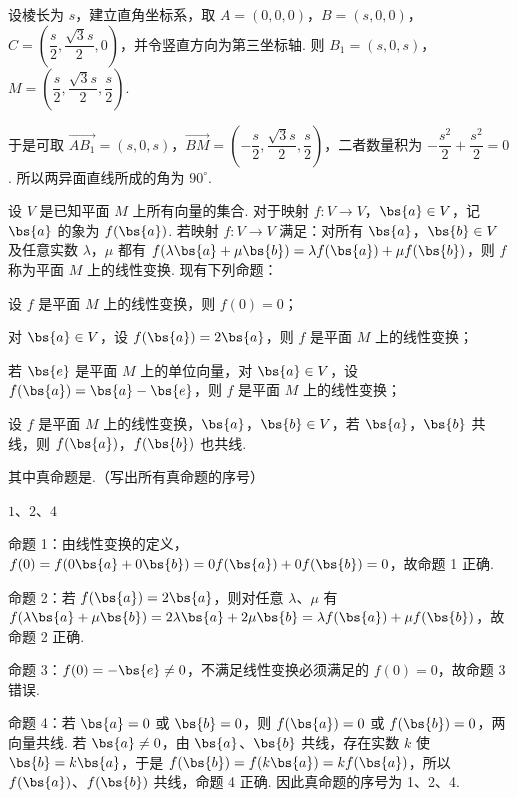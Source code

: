 \begin{solution}
设棱长为 \(s\)，建立直角坐标系，取 \(A=(0,0,0)\)，\(B=(s,0,0)\)，\(C=\left(\dfrac{s}{2},\dfrac{\sqrt{3}s}{2},0\right)\)，并令竖直方向为第三坐标轴. 则 \(B_1=(s,0,s)\)，\(M=\left(\dfrac{s}{2},\dfrac{\sqrt{3}s}{2},\dfrac{s}{2}\right)\).

于是可取 \(\overrightarrow{AB_1}=(s,0,s)\)，\(\overrightarrow{BM}=\left(-\dfrac{s}{2},\dfrac{\sqrt{3}s}{2},\dfrac{s}{2}\right)\)，二者数量积为 \(-\dfrac{s^2}{2}+\dfrac{s^2}{2}=0\). 所以两异面直线所成的角为 \(90^{\circ}\).
\end{solution}

\begin{problem}
设 \(V\) 是已知平面 \(M\) 上所有向量的集合. 对于映射 \(f: V \to V\)，\(\bs{a} \in V\)，记 \(\bs{a}\) 的象为 \(f(\bs{a})\). 若映射 \(f: V \to V\) 满足：对所有 \(\bs{a}\)，\(\bs{b} \in V\) 及任意实数 \(\lambda\)，\(\mu\) 都有 \(f(\lambda\bs{a} + \mu\bs{b}) = \lambda f(\bs{a}) + \mu f(\bs{b})\)，则 \(f\) 称为平面 \(M\) 上的线性变换. 现有下列命题：

\begin{circlelist}
\item 设 \(f\) 是平面 \(M\) 上的线性变换，则 \(f(0) = 0\)；
\item 对 \(\bs{a} \in V\)，设 \(f(\bs{a}) = 2\bs{a}\)，则 \(f\) 是平面 \(M\) 上的线性变换；
\item 若 \(\bs{e}\) 是平面 \(M\) 上的单位向量，对 \(\bs{a} \in V\)，设 \(f(\bs{a}) = \bs{a} - \bs{e}\)，则 \(f\) 是平面 \(M\) 上的线性变换；
\item 设 \(f\) 是平面 \(M\) 上的线性变换，\(\bs{a}\)，\(\bs{b} \in V\)，若 \(\bs{a}\)，\(\bs{b}\) 共线，则 \(f(\bs{a})\)，\(f(\bs{b})\) 也共线.
\end{circlelist}

其中真命题是\fillinblank{}.（写出所有真命题的序号）
\end{problem}

\begin{answer}
\(1\)、\(2\)、\(4\)
\end{answer}

\begin{solution}
命题 1：由线性变换的定义，\(f(0)=f(0\bs{a}+0\bs{b})=0f(\bs{a})+0f(\bs{b})=0\)，故命题 1 正确.

命题 2：若 \(f(\bs{a})=2\bs{a}\)，则对任意 \(\lambda\)、\(\mu\) 有 \(f(\lambda\bs{a}+\mu\bs{b})=2\lambda\bs{a}+2\mu\bs{b}=\lambda f(\bs{a})+\mu f(\bs{b})\)，故命题 2 正确.

命题 3：\(f(0)=-\bs{e}\ne0\)，不满足线性变换必须满足的 \(f(0)=0\)，故命题 3 错误.

命题 4：若 \(\bs{a}=0\) 或 \(\bs{b}=0\)，则 \(f(\bs{a})=0\) 或 \(f(\bs{b})=0\)，两向量共线. 若 \(\bs{a}\ne0\)，由 \(\bs{a}\)、\(\bs{b}\) 共线，存在实数 \(k\) 使 \(\bs{b}=k\bs{a}\)，于是 \(f(\bs{b})=f(k\bs{a})=kf(\bs{a})\)，所以 \(f(\bs{a})\)、\(f(\bs{b})\) 共线，命题 4 正确. 因此真命题的序号为 1、2、4.
\end{solution}


